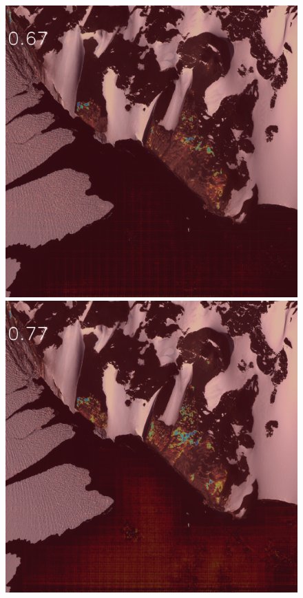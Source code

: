 \begin{figure}[h]
\includegraphics[width=\subFigx]{./fig/datagrow/MSE_single_unet_train_1_1.txt_bias-1_bs128_do0.1e25/4.png}
\includegraphics[width=\subFigx]{./fig/datagrow/MSE_single_unet_train_1_2.txt_bias-1_bs128_do0.1e25/4.png}

\end{figure}
